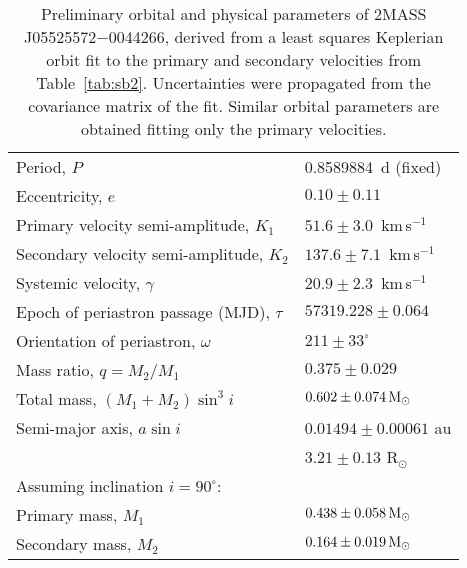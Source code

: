\documentclass[usenatbib]{mnras}
\newcommand{\kms}{\textrm{km\,s$^{-1}$}}
\begin{document}
\begin{table}
\caption[]{Preliminary orbital and physical parameters of 2MASS J05525572$-$0044266, derived from a least squares Keplerian orbit fit to the primary and secondary velocities from Table~\ref{tab:sb2}. Uncertainties were propagated from the covariance matrix of the fit. Similar orbital parameters are obtained fitting only the primary velocities.}
\label{tab:eb}
\begin{tabular}{l l}
\hline
Period, $P$ & 0.8589884~d (fixed)\\
Eccentricity, $e$ & $0.10\pm0.11$\\
Primary velocity semi-amplitude, $K_{1}$ & $51.6\pm3.0$~\kms \\
Secondary velocity semi-amplitude, $K_{2}$ & $137.6\pm7.1$~\kms \\
Systemic velocity, $\gamma$ & $20.9\pm2.3$~\kms\\
Epoch of periastron passage (MJD), $\tau$ & $57319.228\pm 0.064$\\
Orientation of periastron, $\omega$ & $211\pm33^{\circ}$ \\
Mass ratio, $q=M_{2}/M_{1}$ & $0.375\pm0.029$\\
Total mass, $(M_{1}+M_{2})\sin^3 i$ & $0.602\pm0.074\,\rm{M_{\odot}}$\\
Semi-major axis, $a\sin i$ & $0.01494\pm0.00061$ au\\
& $3.21\pm0.13$ R$_{\odot}$\\
Assuming inclination $i=90^{\circ}$:\\[1mm]
Primary mass, $M_{1}$ & $0.438\pm0.058\,\rm{M_{\odot}}$\\
Secondary mass, $M_{2}$ & $0.164\pm0.019\,\rm{M_{\odot}}$\\
\hline
\end{tabular}
\end{table}
\end{document}
